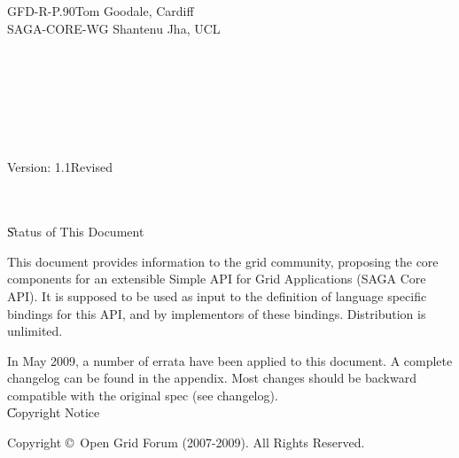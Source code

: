 
\newcommand{\sagadocument}{GFD-R-P.90}
\newcommand{\sagaversion}{1.1}
\newcommand{\sagabasename}{saga_core}
\newcommand{\sagaemail}{saga-core-wg@ogf.org}



\sagaverb{\|}



 \thispagestyle{empty}

 \sagadocument{}\hfill Tom Goodale, Cardiff\\
 SAGA-CORE-WG   \hfill Shantenu Jha, UCL\footnotemark[1]\\
           \\
           \\
           \\
           \\
           \\
           \\[1em]
           \\
  Version: \sagaversion \hfill {Revised \sagadate}


  \hrulefill\\

  \\

  \U{Status of This Document}

  This document provides information to the grid community,
  proposing the core components for an extensible
  Simple API for Grid Applications (SAGA Core API). It is
  supposed to be used as input to the definition of language
  specific bindings for this API, and by implementors of these
  bindings.  Distribution is unlimited.

  In May 2009, a number of errata have been applied to this document.
  A complete changelog can be found in the appendix.  Most changes
  should be backward compatible with the original spec (see
  changelog).\\


  \U{Copyright Notice}

  Copyright \copyright~Open Grid Forum (2007-2009).  All Rights
  Reserved.\\

